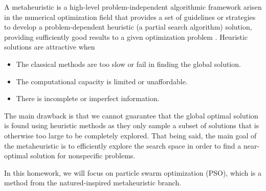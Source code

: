 \documentclass[12pt,a4paper]{article}
\begin{document}

A metaheuristic is a high-level problem-independent algorithmic framework arisen in the numerical optimization field that provides a set of guidelines or strategies to develop a problem-dependent heuristic (a partial search algorithm) solution, providing sufficiently good results to a given optimization problem \cite{ABDELBASSET2018185}. Heuristic solutions are attractive when
\begin{itemize}
    \item The classical methods are too slow or fail in finding the global solution.
    \item The computational capacity is limited or unaffordable.
    \item There is incomplete or imperfect information.
\end{itemize}

The main drawback is that we cannot guarantee that the global optimal solution is found using heuristic methods as they only sample a subset of solutions that is otherwise too large to be completely explored. That being said, the main goal of the metaheuristic is to efficiently explore the search space in order to find a near-optimal solution for nonspecific problems.

In this homework, we will focus on particle swarm optimization (PSO), which is a method from the natured-inspired metaheuristic branch.
\end{document}
